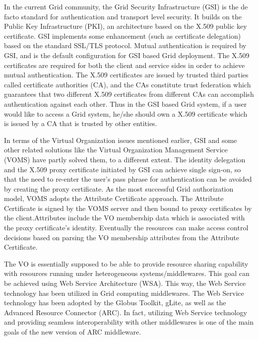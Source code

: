 In the current Grid community, the Grid Security Infrastructure (GSI)\cite{IFoster98} is the de facto standard for authentication and transport level security. It builds on the Public Key Infrastructure (PKI), an architecture based on the X.509 public key certificate. GSI implements some enhancement (such as certificate delegation) based on the standard SSL/TLS protocol. Mutual authentication is required by GSI, and is the default configuration for GSI based Grid deployment. The X.509 certificates are required for both the client and service sides in order to achieve mutual authentication. The X.509 certificates are issued by trusted third parties called certificate authorities (CA), and the CAs constitute trust federation which guarantees that two different X.509 certificates from different CAs can accomplish authentication against each other. Thus in the GSI based Grid system, if a user would like to access a Grid system, he/she should own a X.509 certificate which is issued by a CA that is trusted by other entities.

In terms of the Virtual Organization issues mentioned earlier, GSI and some other related solutions like the Virtual Organization Management Service (VOMS)\cite{AlfieriR05} have partly solved them, to a different extent. The identity delegation and the X.509 proxy certificate initiated by GSI can achieve single sign-on, so that the need to re-enter the user’s pass phrase for authentication can be avoided by creating the proxy certificate.  As the most successful Grid authorization model, VOMS adopts the Attribute Certificate\cite{RFC3821link} approach. The Attribute Certificate is signed by the VOMS server and then bound to proxy certificates by the client.Attributes include the VO membership data which is associated with the proxy certificate’s identity. Eventually the resources can make access control decisions based on parsing the VO membership attributes from the Attribute Certificate.

The VO is essentially supposed to be able to provide resource sharing capability with resources running under heterogeneous systems/middlewares. This goal can be achieved using Web Service Architecture (WSA). This way, the Web Service technology has been utilized in Grid computing middlewares. The Web Service technology has been adopted by the Globus Toolkit\cite{GTlink}, gLite\cite{gLitelink}, as well as the Advanced Resource Connector (ARC)\cite{ARClink}. In fact, utilizing Web Service technology and providing seamless interoperability with other middlewares is one of the main goals of the new version of ARC middleware.

